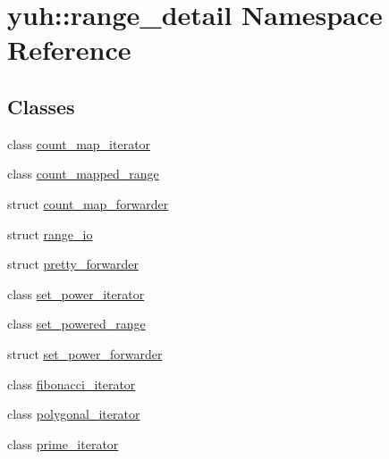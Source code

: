 \hypertarget{namespaceyuh_1_1range__detail}{\section{yuh\-:\-:range\-\_\-detail \-Namespace \-Reference}
\label{da/dda/namespaceyuh_1_1range__detail}
}
\subsection*{\-Classes}
\begin{DoxyCompactItemize}
\item 
class \hyperlink{classyuh_1_1range__detail_1_1count__map__iterator}{count\-\_\-map\-\_\-iterator}
\item 
class \hyperlink{classyuh_1_1range__detail_1_1count__mapped__range}{count\-\_\-mapped\-\_\-range}
\item 
struct \hyperlink{structyuh_1_1range__detail_1_1count__map__forwarder}{count\-\_\-map\-\_\-forwarder}
\item 
struct \hyperlink{structyuh_1_1range__detail_1_1range__io}{range\-\_\-io}
\item 
struct \hyperlink{structyuh_1_1range__detail_1_1pretty__forwarder}{pretty\-\_\-forwarder}
\item 
class \hyperlink{classyuh_1_1range__detail_1_1set__power__iterator}{set\-\_\-power\-\_\-iterator}
\item 
class \hyperlink{classyuh_1_1range__detail_1_1set__powered__range}{set\-\_\-powered\-\_\-range}
\item 
struct \hyperlink{structyuh_1_1range__detail_1_1set__power__forwarder}{set\-\_\-power\-\_\-forwarder}
\item 
class \hyperlink{classyuh_1_1range__detail_1_1fibonacci__iterator}{fibonacci\-\_\-iterator}
\item 
class \hyperlink{classyuh_1_1range__detail_1_1polygonal__iterator}{polygonal\-\_\-iterator}
\item 
class \hyperlink{classyuh_1_1range__detail_1_1prime__iterator}{prime\-\_\-iterator}
\end{DoxyCompactItemize}
